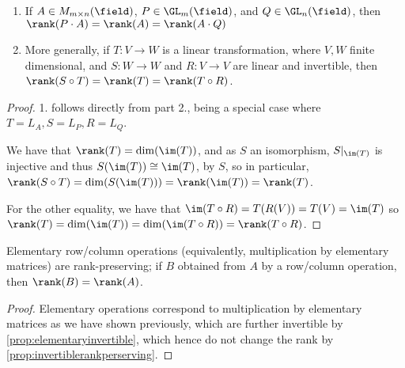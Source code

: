 \begin{proposition}\label{prop:invertiblerankperserving}
    \begin{enumerate}
        \item If $A \in M_{m \times n}(\field)$, $P \in \GL_m(\field)$\footnotemark, and $Q \in \GL_n(\field)$, then $\rank (P \cdot A) = \rank(A) = \rank(A \cdot Q)$
        \item More generally, if $T : V \to W$ is a linear transformation, where $V, W$ finite dimensional, and $S : W \to W$ and $R : V \to V$ are linear and invertible, then $\rank(S \circ T) = \rank(T) = \rank(T \circ R)$.
    \end{enumerate}
\end{proposition}

\begin{proof}
    1. follows directly from part 2., being a special case where $T = L_A, S = L_P, R = L_Q$.

    We have that $\rank(T) = \dim(\im(T))$, and as $S$ an isomorphism, $S\vert_{\im(T)}$ is injective and thus $S(\im(T)) \cong \im(T)$, by $S$, so in particular, $\rank(S \circ T) = \dim(S(\im(T))) = \rank(\im(T)) = \rank(T)$.

    For the other equality, we have that $\im(T \circ R) = T(R(V)) = T(V) = \im(T)$ so $\rank(T) = \dim(\im(T)) = \dim(\im(T \circ R)) = \rank(T \circ R)$.
\end{proof}

\begin{corollary}
    Elementary row/column operations (equivalently, multiplication by elementary matrices) are rank-preserving; if $B$ obtained from $A$ by a row/column operation, then $\rank(B) = \rank(A)$.
\end{corollary}

\begin{proof}
    Elementary operations correspond to multiplication by elementary matrices as we have shown previously, which are further invertible by \cref{prop:elementaryinvertible}, which hence do not change the rank by \cref{prop:invertiblerankperserving}.
\end{proof}

